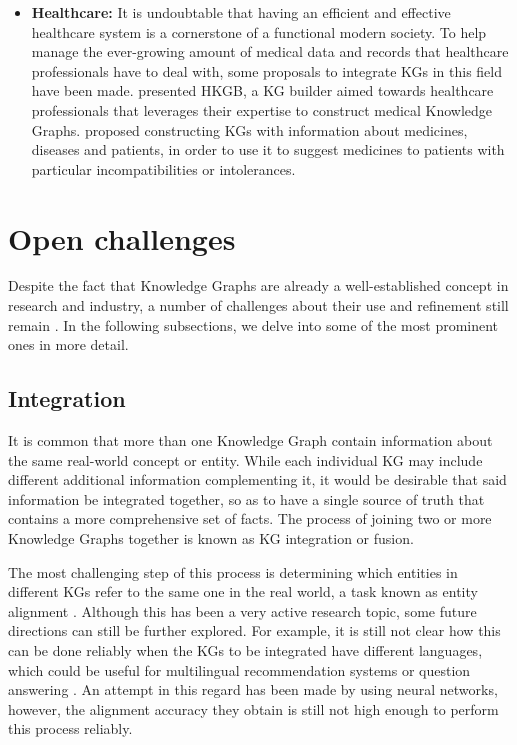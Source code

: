 \begin{itemize}
    \item \textbf{Healthcare:} It is undoubtable that having an efficient and effective healthcare system is a cornerstone of a functional modern society. To help manage the ever-growing amount of medical data and records that healthcare professionals have to deal with, some proposals to integrate KGs in this field have been made. \citet{zhang2020b} presented HKGB, a KG builder aimed towards healthcare professionals that leverages their expertise to construct medical Knowledge Graphs. \citet{gong2021} proposed constructing KGs with information about medicines, diseases and patients, in order to use it to suggest medicines to patients with particular incompatibilities or intolerances. 
\end{itemize}

\section{Open challenges}\label{sec:kgs-challenges}
Despite the fact that Knowledge Graphs are already a well-established concept in research and industry, a number of challenges about their use and refinement still remain \cite{paulheim2017, hogan2020, peng2023}. In the following subsections, we delve into some of the most prominent ones in more detail. 

\subsection{Integration}
It is common that more than one Knowledge Graph contain information about the same real-world concept or entity. While each individual KG may include different additional information complementing it, it would be desirable that said information be integrated together, so as to have a single source of truth that contains a more comprehensive set of facts. The process of joining two or more Knowledge Graphs together is known as KG integration or fusion.

The most challenging step of this process is determining which entities in different KGs refer to the same one in the real world, a task known as entity alignment \cite{ren2022}. Although this has been a very active research topic, some future directions can still be further explored. For example, it is still not clear how this can be done reliably when the KGs to be integrated have different languages, which could be useful for multilingual recommendation systems or question answering \cite{javed2021}. An attempt in this regard has been made by \citet{xu2019} using neural networks, however, the alignment accuracy they obtain is still not high enough to perform this process reliably.

